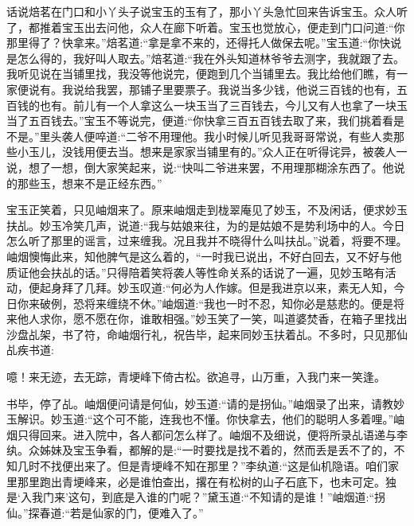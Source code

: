 


\begin{parag}
    话说焙茗在门口和小丫头子说宝玉的玉有了，那小丫头急忙回来告诉宝玉。众人听了，都推着宝玉出去问他，众人在廊下听着。宝玉也觉放心，便走到门口问道:“你那里得了？快拿来。”焙茗道:“拿是拿不来的，还得托人做保去呢。”宝玉道:“你快说是怎么得的，我好叫人取去。”焙茗道:“我在外头知道林爷爷去测字，我就跟了去。我听见说在当铺里找，我没等他说完，便跑到几个当铺里去。我比给他们瞧，有一家便说有。我说给我罢，那铺子里要票子。我说当多少钱，他说三百钱的也有，五百钱的也有。前儿有一个人拿这么一块玉当了三百钱去，今儿又有人也拿了一块玉当了五百钱去。”宝玉不等说完，便道:“你快拿三百五百钱去取了来，我们挑着看是不是。”里头袭人便啐道:“二爷不用理他。我小时候儿听见我哥哥常说，有些人卖那些小玉儿，没钱用便去当。想来是家家当铺里有的。”众人正在听得诧异，被袭人一说，想了一想，倒大家笑起来，说:“快叫二爷进来罢，不用理那糊涂东西了。他说的那些玉，想来不是正经东西。”
\end{parag}


\begin{parag}
    宝玉正笑着，只见岫烟来了。原来岫烟走到栊翠庵见了妙玉，不及闲话，便求妙玉扶乩。妙玉冷笑几声，说道:“我与姑娘来往，为的是姑娘不是势利场中的人。今日怎么听了那里的谣言，过来缠我。况且我并不晓得什么叫扶乩。”说着，将要不理。岫烟懊悔此来，知他脾气是这么着的，“一时我已说出，不好白回去，又不好与他质证他会扶乩的话。”只得陪着笑将袭人等性命关系的话说了一遍，见妙玉略有活动，便起身拜了几拜。妙玉叹道:“何必为人作嫁。但是我进京以来，素无人知，今日你来破例，恐将来缠绕不休。”岫烟道:“我也一时不忍，知你必是慈悲的。便是将来他人求你，愿不愿在你，谁敢相强。”妙玉笑了一笑，叫道婆焚香，在箱子里找出沙盘乩架，书了符，命岫烟行礼，祝告毕，起来同妙玉扶着乩。不多时，只见那仙乩疾书道:
\end{parag}


\begin{qute2sp}
    噫！来无迹，去无踪，青埂峰下倚古松。欲追寻，山万重，入我门来一笑逢。
\end{qute2sp}


\begin{parag}
    书毕，停了乩。岫烟便问请是何仙，妙玉道:“请的是拐仙。”岫烟录了出来，请教妙玉解识。妙玉道:“这个可不能，连我也不懂。你快拿去，他们的聪明人多着哩。”岫烟只得回来。进入院中，各人都问怎么样了。岫烟不及细说，便将所录乩语递与李纨。众姊妹及宝玉争看，都解的是:“一时要找是找不着的，然而丢是丢不了的，不知几时不找便出来了。但是青埂峰不知在那里？”李纨道:“这是仙机隐语。咱们家里那里跑出青埂峰来，必是谁怕查出，撂在有松树的山子石底下，也未可定。独是‘入我门来’这句，到底是入谁的门呢？”黛玉道:“不知请的是谁！”岫烟道:“拐仙。”探春道:“若是仙家的门，便难入了。”
\end{parag}


